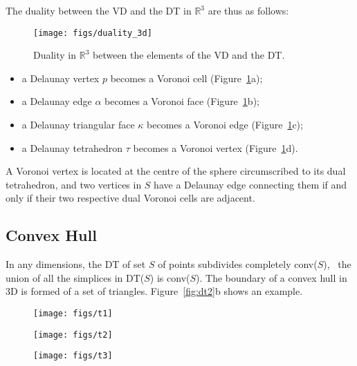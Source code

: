 The duality between the VD and the DT in $\mathbb{R}^3$ are thus as follows: 
\begin{figure}
  \centering
  \texttt{[image: figs/duality\_3d]}
  \caption{Duality in $\mathbb{R}^{3}$ between the elements of the VD and the DT.}%
\label{fig:duality_3d}
\end{figure}
\begin{itemize}
  \item a Delaunay vertex $p$ becomes a Voronoi cell (Figure~\ref{fig:duality_3d}a); 
  \item a Delaunay edge $\alpha$ becomes a Voronoi face (Figure~\ref{fig:duality_3d}b);
  \item a Delaunay triangular face $\kappa$ becomes a Voronoi edge (Figure~\ref{fig:duality_3d}c);
  \item a Delaunay tetrahedron $\tau$ becomes a Voronoi vertex (Figure~\ref{fig:duality_3d}d). 
\end{itemize}
A Voronoi vertex is located at the centre of the sphere circumscribed to its dual tetrahedron, and two vertices in $S$ have a Delaunay edge connecting them if and only if their two respective dual Voronoi cells are adjacent.


\subsection{Convex Hull}
In any dimensions, the DT of set $S$ of points subdivides completely conv($S$), \ie\ the union of all the simplices in DT($S$) is conv($S$).
The boundary of a convex hull in 3D is formed of a set of triangles.
Figure~\ref{fig:dt2}b shows an example.
\begin{figure*}
  \centering
  \begin{subfigure}[b]{0.29\linewidth}
    \texttt{[image: figs/t1]}
    \caption{}
  \end{subfigure}%
  \qquad
  \begin{subfigure}[b]{0.29\linewidth}
    \texttt{[image: figs/t2]}
    \caption{}
  \end{subfigure}%
  \qquad
  \begin{subfigure}[b]{0.29\linewidth}
    \texttt{[image: figs/t3]}
    \caption{}
  \end{subfigure}%
  \caption[A set of points, its convex hull and its Delaunay tetrahedralisation]{\textbf{(a)} A set of 1000 points randomly distributed in a cube. \textbf{(b)} Its convex hull. \textbf{(c)} The Delaunay tetrahedralisation of the points, `sliced' in the middle and the upper tetrahedra removed (to be able to visualise the interior).}%
\label{fig:dt2}
\end{figure*}


